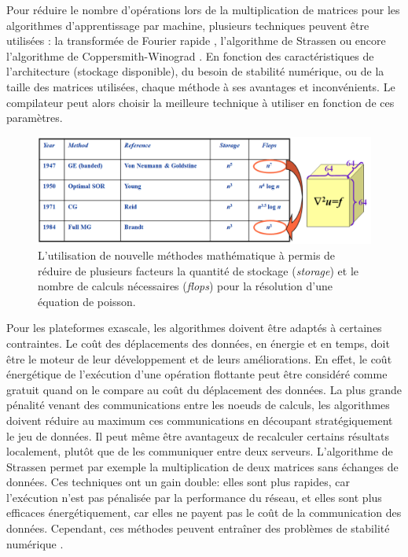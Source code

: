             Pour réduire le nombre d’opérations lors de la multiplication de matrices pour les algorithmes d’apprentissage par machine, plusieurs techniques peuvent être utilisées \cite{Sze2017}: la transformée de Fourier rapide \cite{Vasilache2014}, l’algorithme de Strassen \cite{Cong2014} ou encore l'algorithme de Coppersmith-Winograd \cite{Li2016}. En fonction des caractéristiques de l’architecture (stockage disponible), du besoin de stabilité numérique, ou de la taille des matrices utilisées, chaque méthode à ses avantages et inconvénients. Le compilateur peut alors choisir la meilleure technique à utiliser en fonction de ces paramètres.
    
            \begin{figure}
            \center
            \includegraphics[width=14cm]{images/edl_new_algo.png}
            \caption{\label{fig:edl_new_algo} L'utilisation de nouvelle méthodes mathématique à permis de réduire de plusieurs facteurs la quantité de stockage (\textit{storage}) et le nombre de calculs nécessaires (\textit{flops}) pour la résolution d'une équation de poisson\protect\footnotemark.}
            \end{figure}

            Pour les plateformes exascale, les algorithmes doivent être adaptés à certaines contraintes. Le coût des déplacements des données, en énergie et en temps, doit être le moteur de leur développement et de leurs améliorations. En effet, le coût énergétique de l'exécution d’une opération flottante peut être considéré comme gratuit quand on le compare au coût du déplacement des données. La plus grande pénalité venant des communications entre les noeuds de calculs, les algorithmes doivent réduire au maximum ces communications en découpant stratégiquement le jeu de données. Il peut même être avantageux de recalculer certains résultats localement, plutôt que de les communiquer entre deux serveurs. L'algorithme de Strassen \cite{Lipshitz2012} permet par exemple la multiplication de deux matrices sans échanges de données. Ces techniques ont un gain double: elles sont plus rapides, car l’exécution n’est pas pénalisée par la performance du réseau, et elles sont plus efficaces énergétiquement, car elles ne payent pas le coût de la communication des données. Cependant, ces méthodes peuvent entraîner des problèmes de stabilité numérique \cite{khabou2013dense}. 
                        


